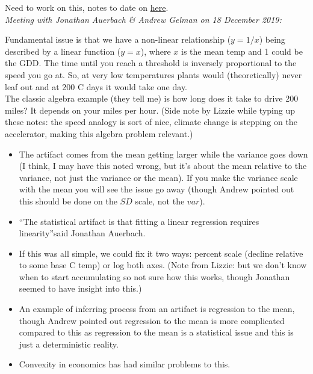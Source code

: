 \documentclass[11pt,letter]{article}
\begin{document}
Need to work on this, notes to date on \href{https://github.com/lizzieinvancouver/ospree/wiki/Statistical-artifacts-in-sensitivities}{here}.\\

\emph{Meeting with Jonathan Auerbach \& Andrew Gelman on 18 December 2019:} 

Fundamental issue is that we have a non-linear relationship ($y=1/x$) being described by a linear function ($y=x$), where $x$ is the mean temp and 1 could be the GDD. The time until you reach a threshold is inversely proportional to the speed you go at. So, at very low temperatures plants would (theoretically) never leaf out and at 200 C days it would take one day. \\

The classic algebra example (they tell me) is how long does it take to drive 200 miles? It depends on your miles per hour. (Side note by Lizzie while typing up these notes: the speed analogy is sort of nice, climate change is stepping on the accelerator, making this algebra problem relevant.)

\begin{itemize}
\item The artifact comes from the mean getting larger while the variance goes down (I think, I may have this noted wrong, but it's about the mean relative to the variance, not just the variance or the mean). If you make the variance scale with the mean you will see the issue go away (though Andrew pointed out this should be done on the $SD$ scale, not the $var$).
\item ``The statistical artifact is that fitting a linear regression requires linearity''said  Jonathan Auerbach.
\item If this was all simple, we could fix it two ways: percent scale (decline relative to some base C temp) or log both axes. (Note from Lizzie: but we don't know when to start accumulating so not sure how this works, though Jonathan seemed to have insight into this.)
\item An example of inferring process from an artifact is regression to the mean, though Andrew pointed out regression to the mean is more complicated compared to this as regression to the mean is a statistical issue and this is just a deterministic reality. 
\item Convexity in economics has had similar problems to this. 
\end{itemize}
\end{document}
